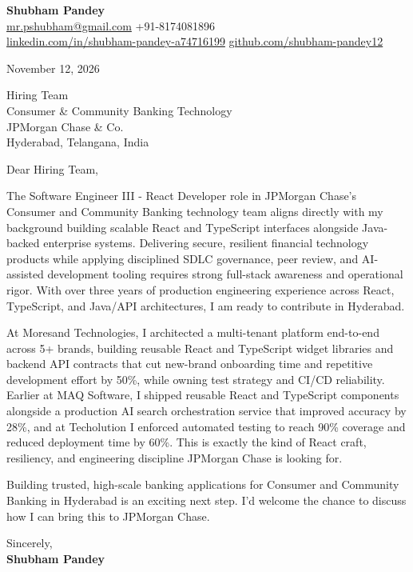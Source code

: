 \documentclass[a4paper,11pt]{article}
\begin{document}
\textbf{\Large Shubham Pandey}\\
\href{mailto:mr.pshubham@gmail.com}{mr.pshubham@gmail.com} \quad +91-8174081896\\
\href{https://www.linkedin.com/in/shubham-pandey-a74716199/}{linkedin.com/in/shubham-pandey-a74716199} \quad
\href{https://github.com/shubham-pandey12}{github.com/shubham-pandey12}

\vspace{1em}
November 12, 2026

\vspace{1em}
Hiring Team\\
Consumer \& Community Banking Technology\\
JPMorgan Chase \& Co.\\
Hyderabad, Telangana, India

\vspace{1em}
Dear Hiring Team,

The Software Engineer III - React Developer role in JPMorgan Chase's Consumer and Community Banking technology team aligns directly with my background building scalable React and TypeScript interfaces alongside Java-backed enterprise systems. Delivering secure, resilient financial technology products while applying disciplined SDLC governance, peer review, and AI-assisted development tooling requires strong full-stack awareness and operational rigor. With over three years of production engineering experience across React, TypeScript, and Java/API architectures, I am ready to contribute in Hyderabad.

At Moresand Technologies, I architected a multi-tenant platform end-to-end across 5+ brands, building reusable React and TypeScript widget libraries and backend API contracts that cut new-brand onboarding time and repetitive development effort by 50\%, while owning test strategy and CI/CD reliability. Earlier at MAQ Software, I shipped reusable React and TypeScript components alongside a production AI search orchestration service that improved accuracy by 28\%, and at Techolution I enforced automated testing to reach 90\% coverage and reduced deployment time by 60\%. This is exactly the kind of React craft, resiliency, and engineering discipline JPMorgan Chase is looking for.

Building trusted, high-scale banking applications for Consumer and Community Banking in Hyderabad is an exciting next step. I'd welcome the chance to discuss how I can bring this to JPMorgan Chase.

\vspace{1em}
Sincerely,\\[0.5em]
\textbf{Shubham Pandey}
\end{document}
